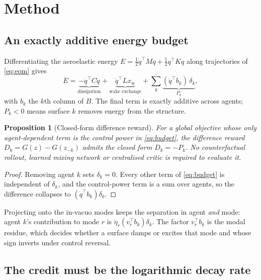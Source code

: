 \documentclass[preprint,11pt,authoryear]{elsarticle}
\newtheorem{proposition}{Proposition}
\begin{document}
\section{Method}
\label{sec:method}

\subsection{An exactly additive energy budget}

Differentiating the aeroelastic energy
$E=\tfrac12 \dot q^{\top} M \dot q + \tfrac12 q^{\top} K q$ along trajectories of
\eqref{eq:eom} gives
\begin{equation}
\dot E
= \underbrace{-\dot q^{\top} C \dot q}_{\text{dissipation}}
+ \underbrace{\dot q^{\top} L x_{\mathrm{w}}}_{\text{wake exchange}}
+ \sum_{k} \underbrace{(\dot q^{\top} b_k)\, \delta_k}_{P_k} ,
\label{eq:budget}
\end{equation}
with $b_k$ the $k$th column of $B$. The final term is exactly additive across
agents; $P_k<0$ means surface $k$ removes energy from the structure.

\begin{proposition}[Closed-form difference reward]
\label{prop:diff}
For a global objective whose only agent-dependent term is the control power in
\eqref{eq:budget}, the difference reward $D_k = G(z) - G(z_{-k})$ admits the
closed form $D_k = -P_k$. No counterfactual rollout, learned mixing network or
centralised critic is required to evaluate it.
\end{proposition}

\begin{proof}
Removing agent $k$ sets $\delta_k=0$. Every other term of \eqref{eq:budget} is
independent of $\delta_k$, and the control-power term is a sum over agents, so
the difference collapses to $(\dot q^{\top} b_k)\delta_k$.
\end{proof}

Projecting onto the in-vacuo modes keeps the separation in agent \emph{and} mode:
agent $k$'s contribution to mode $r$ is $\dot\eta_r (v_r^{\top} b_k)\delta_k$.
The factor $v_r^{\top} b_k$ is the modal residue, which decides whether a surface
damps or excites that mode and whose sign inverts under control reversal.

\subsection{The credit must be the logarithmic decay rate}
\label{sec:log}
\end{document}
